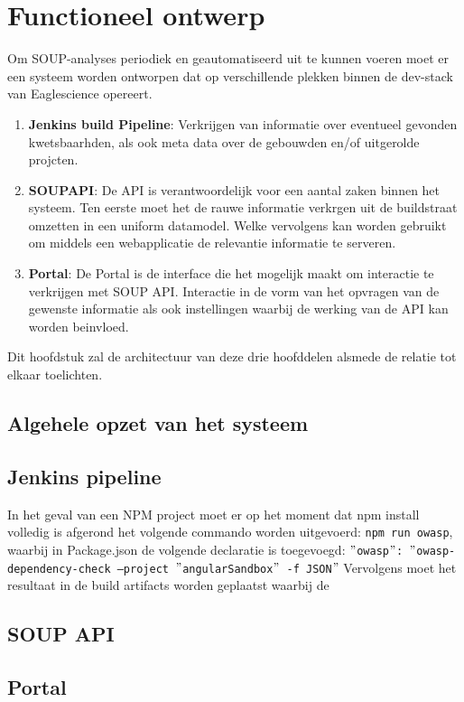 \chapter{Functioneel ontwerp}\label{ch:impl-architectuur}

Om SOUP-analyses periodiek en geautomatiseerd uit te kunnen voeren moet er een systeem worden ontworpen dat op verschillende plekken binnen de dev-stack van Eaglescience opereert.

\begin{enumerate}
    \item \textbf{Jenkins build Pipeline}: Verkrijgen van informatie over eventueel gevonden kwetsbaarhden, als ook meta data over de gebouwden en/of uitgerolde projcten.
    \item \textbf{SOUPAPI}: De API is verantwoordelijk voor een aantal zaken binnen het systeem. Ten eerste moet het de rauwe informatie verkrgen uit de buildstraat omzetten in een uniform datamodel. Welke vervolgens kan worden gebruikt om middels een webapplicatie de relevantie informatie te serveren.
    \item \textbf{Portal}: De Portal is de interface die het mogelijk maakt om interactie te verkrijgen met SOUP API. Interactie in de vorm van het opvragen van de gewenste informatie als ook instellingen waarbij de werking van de API kan worden beinvloed.
\end{enumerate}
Dit hoofdstuk zal de architectuur van deze drie hoofddelen alsmede de relatie tot elkaar toelichten.


\section{Algehele opzet van het systeem}\label{sec:algehele-opzet-van-het-systeem}


\section{Jenkins pipeline}\label{sec:jenkins-pipeline}

In het geval van een NPM project moet er op het moment dat npm install volledig is afgerond het volgende commando worden uitgevoerd: \texttt{npm run owasp}, waarbij in Package.json de volgende declaratie is toegevoegd: \texttt{$"$owasp$"$: $"$owasp-dependency-check --project $"$angularSandbox$"$ -f JSON$"$} Vervolgens moet het resultaat in de build artifacts worden geplaatst waarbij de

\section{SOUP API}\label{sec:soup-api}

\section{Portal}\label{sec:portal}
